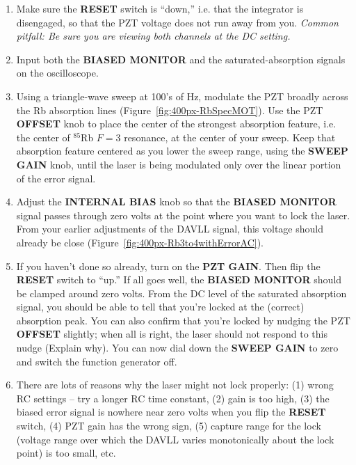 \documentclass{../lab}
\begin{document}
\begin{enumerate}
    \item Make sure the \textbf{RESET} switch is ``down,'' i.e. that the integrator is disengaged, so that the PZT voltage does not run away from you. \emph{Common pitfall: Be sure you are viewing both channels at the DC setting.}

    \item Input both the \textbf{BIASED MONITOR} and the saturated-absorption signals on the oscilloscope.

    \item Using a triangle-wave sweep at 100's of Hz, modulate the PZT broadly across the Rb absorption lines (Figure~\ref{fig:400px-RbSpecMOT}). Use the PZT \textbf{OFFSET} knob to place the center of the strongest absorption feature, i.e. the center of $^{85}$Rb $F=3 $ resonance, at the center of your sweep. Keep that absorption feature centered as you lower the sweep range, using the \textbf{SWEEP GAIN} knob, until the laser is being modulated only over the linear portion of the error signal.

    \item Adjust the \textbf{INTERNAL BIAS} knob so that the \textbf{BIASED MONITOR} signal passes through zero volts at the point where you want to lock the laser. From your earlier adjustments of the DAVLL signal, this voltage should already be close (Figure~\ref{fig:400px-Rb3to4withErrorAC}).

    \item If you haven't done so already, turn on the \textbf{PZT GAIN}. Then flip the \textbf{RESET} switch to ``up.'' If all goes well, the \textbf{BIASED MONITOR} should be clamped around zero volts. From the DC level of the saturated absorption signal, you should be able to tell that you're locked at the (correct) absorption peak. You can also confirm that you're locked by nudging the PZT \textbf{OFFSET} slightly; when all is right, the laser should not respond to this nudge (Explain why). You can now dial down the \textbf{SWEEP GAIN} to zero and switch the function generator off.

    \item There are lots of reasons why the laser might not lock properly: (1) wrong RC settings -- try a longer RC time constant, (2) gain is too high, (3) the biased error signal is nowhere near zero volts when you flip the \textbf{RESET} switch, (4) PZT gain has the wrong sign, (5) capture range for the lock (voltage range over which the DAVLL varies monotonically about the lock point) is too small, etc.
\end{enumerate}
\end{document}
